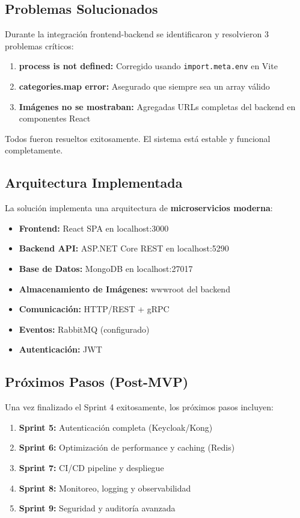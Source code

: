 \documentclass[12pt,a4paper]{article}
\begin{document}
\subsection{Problemas Solucionados}

Durante la integración frontend-backend se identificaron y resolvieron 3 problemas críticos:

\begin{enumerate}
    \item \textbf{process is not defined:} Corregido usando \texttt{import.meta.env} en Vite
    \item \textbf{categories.map error:} Asegurado que siempre sea un array válido
    \item \textbf{Imágenes no se mostraban:} Agregadas URLs completas del backend en componentes React
\end{enumerate}

Todos fueron resueltos exitosamente. El sistema está estable y funcional completamente.

\subsection{Arquitectura Implementada}

La solución implementa una arquitectura de \textbf{microservicios moderna}:

\begin{itemize}
    \item \textbf{Frontend:} React SPA en localhost:3000
    \item \textbf{Backend API:} ASP.NET Core REST en localhost:5290
    \item \textbf{Base de Datos:} MongoDB en localhost:27017
    \item \textbf{Almacenamiento de Imágenes:} wwwroot del backend
    \item \textbf{Comunicación:} HTTP/REST + gRPC
    \item \textbf{Eventos:} RabbitMQ (configurado)
    \item \textbf{Autenticación:} JWT
\end{itemize}

\subsection{Próximos Pasos (Post-MVP)}

Una vez finalizado el Sprint 4 exitosamente, los próximos pasos incluyen:

\begin{enumerate}
    \item \textbf{Sprint 5:} Autenticación completa (Keycloak/Kong)
    \item \textbf{Sprint 6:} Optimización de performance y caching (Redis)
    \item \textbf{Sprint 7:} CI/CD pipeline y despliegue
    \item \textbf{Sprint 8:} Monitoreo, logging y observabilidad
    \item \textbf{Sprint 9:} Seguridad y auditoría avanzada
\end{enumerate}
\end{document}
